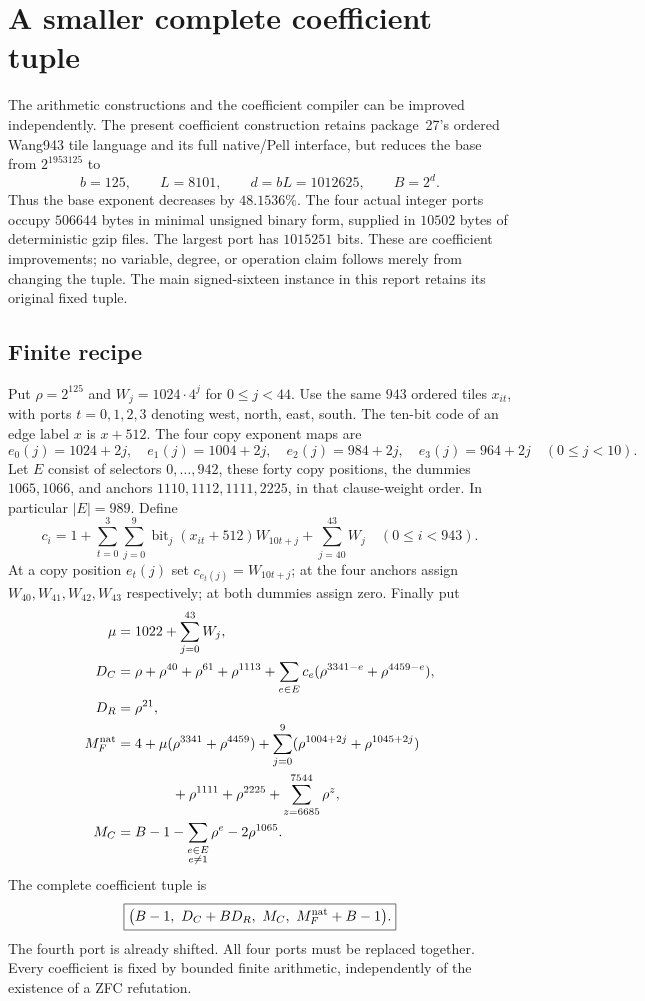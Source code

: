 \section{A smaller complete coefficient tuple}
\label{sec:smaller-coefficients}

The arithmetic constructions and the coefficient compiler can be improved
independently.  The present coefficient construction retains package~27's
ordered Wang943 tile language and its full native/Pell interface, but reduces
the base from $2^{1953125}$ to
\[
 b=125,\qquad L=8101,\qquad d=bL=1012625,\qquad B=2^d.
\]
Thus the base exponent decreases by $48.1536\%$.  The four actual integer
ports occupy $506644$ bytes in minimal unsigned binary form, supplied in
$10502$ bytes of deterministic gzip files.  The largest port has $1015251$
bits.  These are coefficient improvements; no variable, degree, or operation
claim follows merely from changing the tuple.  The main signed-sixteen
instance in this report retains its original fixed tuple.

\subsection{Finite recipe}

Put $\rho=2^{125}$ and $W_j=1024\cdot4^j$ for $0\le j<44$.  Use the
same $943$ ordered tiles $x_{it}$, with ports $t=0,1,2,3$ denoting west,
north, east, south.  The ten-bit code of an edge label $x$ is $x+512$.
The four copy exponent maps are
\[
 e_0(j)=1024+2j,\quad e_1(j)=1004+2j,\quad
 e_2(j)=984+2j,\quad e_3(j)=964+2j \quad(0\le j<10).
\]
Let $E$ consist of selectors $0,\ldots,942$, these forty copy positions,
the dummies $1065,1066$, and anchors $1110,1112,1111,2225$, in that
clause-weight order.  In particular $|E|=989$.  Define
\[
 c_i=1+\sum_{t=0}^3\sum_{j=0}^9
       \operatorname{bit}_j(x_{it}+512)W_{10t+j}
       +\sum_{j=40}^{43}W_j
       \quad(0\le i<943).
\]
At a copy position $e_t(j)$ set $c_{e_t(j)}=W_{10t+j}$; at the four
anchors assign $W_{40},W_{41},W_{42},W_{43}$ respectively; at both
dummies assign zero.  Finally put
\begin{align*}
 \mu&=1022+\sum_{j=0}^{43}W_j,\\
 D_C&=\rho+\rho^{40}+\rho^{61}+\rho^{1113}
       +\sum_{e\in E}c_e(\rho^{3341-e}+\rho^{4459-e}),\\
 D_R&=\rho^{21},\\
 M_F^{\rm nat}&=4+\mu(\rho^{3341}+\rho^{4459})
       +\sum_{j=0}^{9}(\rho^{1004+2j}+\rho^{1045+2j})\\
       &\hspace{14mm}+\rho^{1111}+\rho^{2225}
       +\sum_{z=6685}^{7544}\rho^z,\\
 M_C&=B-1-\sum_{\substack{e\in E\\ e\ne1}}\rho^e-2\rho^{1065}.
\end{align*}
The complete coefficient tuple is
\[
 \boxed{\bigl(B-1,\ D_C+BD_R,\ M_C,\ M_F^{\rm nat}+B-1\bigr).}
\]
The fourth port is already shifted.  All four ports must be replaced
together.  Every coefficient is fixed by bounded finite arithmetic,
independently of the existence of a ZFC refutation.

